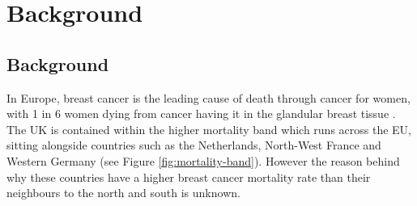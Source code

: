 \chapter{Background}

\section{Background}



In Europe, breast cancer is the leading cause of death through cancer for women, with 1 in 6 women dying from cancer having it in the glandular breast tissue \cite{European_Commission_2009}. The UK is contained within the higher mortality band which runs across the EU, sitting alongside countries such as the Netherlands, North-West France and Western Germany (see Figure \ref{fig:mortality-band}). However the reason behind why these countries have a higher breast cancer mortality rate than their neighbours to the north and south is unknown.

